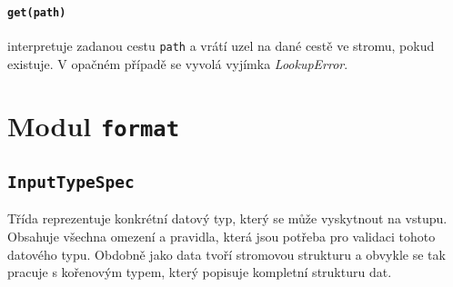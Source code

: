 \documentclass[FM,MP]{tulthesis}
\begin{document}
				\paragraph{\texttt{get(path)}}
					interpretuje zadanou cestu \texttt{path} a vrátí uzel na dané cestě ve stromu, pokud existuje. V opačném případě se vyvolá vyjímka \textit{LookupError}.

	\section{Modul \texttt{format}}
		\subsection*{\texttt{InputTypeSpec}}
			\label{input-type-spec}
			Třída reprezentuje konkrétní datový typ, který se může vyskytnout na vstupu. Obsahuje všechna omezení a pravidla, která jsou potřeba pro validaci tohoto datového typu. Obdobně jako data tvoří stromovou strukturu a obvykle se tak pracuje s kořenovým typem, který popisuje kompletní strukturu dat.
\end{document}
